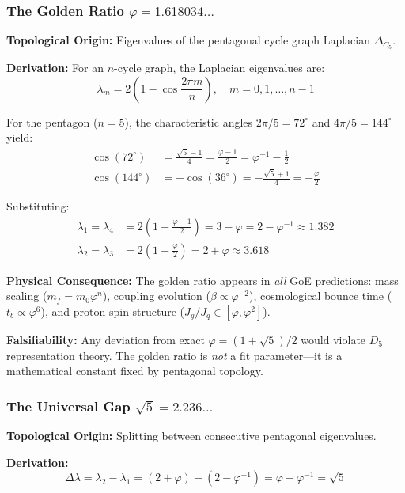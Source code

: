 \documentclass[12pt]{article}
\begin{document}
\subsubsection{The Golden Ratio $\varphi = 1.618034\ldots$}

\textbf{Topological Origin:} Eigenvalues of the pentagonal cycle graph Laplacian $\Delta_{C_5}$.

\textbf{Derivation:} For an $n$-cycle graph, the Laplacian eigenvalues are:
\begin{equation}
\lambda_m = 2\left(1 - \cos\frac{2\pi m}{n}\right), \quad m = 0, 1, \ldots, n-1
\end{equation}

For the pentagon ($n=5$), the characteristic angles $2\pi/5 = 72^\circ$ and $4\pi/5 = 144^\circ$ yield:
\begin{align}
\cos(72^\circ) &= \frac{\sqrt{5} - 1}{4} = \frac{\varphi - 1}{2} = \varphi^{-1} - \frac{1}{2} \\
\cos(144^\circ) &= -\cos(36^\circ) = -\frac{\sqrt{5} + 1}{4} = -\frac{\varphi}{2}
\end{align}

Substituting:
\begin{align}
\lambda_1 = \lambda_4 &= 2\left(1 - \frac{\varphi - 1}{2}\right) = 3 - \varphi = 2 - \varphi^{-1} \approx 1.382 \\
\lambda_2 = \lambda_3 &= 2\left(1 + \frac{\varphi}{2}\right) = 2 + \varphi \approx 3.618
\end{align}

\textbf{Physical Consequence:} The golden ratio appears in \textit{all} GoE predictions: mass scaling ($m_f = m_0 \varphi^n$), coupling evolution ($\beta \propto \varphi^{-2}$), cosmological bounce time ($t_b \propto \varphi^6$), and proton spin structure ($J_g/J_q \in [\varphi, \varphi^2]$).

\textbf{Falsifiability:} Any deviation from exact $\varphi = (1+\sqrt{5})/2$ would violate $D_5$ representation theory. The golden ratio is \textit{not} a fit parameter—it is a mathematical constant fixed by pentagonal topology.

\subsubsection{The Universal Gap $\sqrt{5} = 2.236\ldots$}

\textbf{Topological Origin:} Splitting between consecutive pentagonal eigenvalues.

\textbf{Derivation:}
\begin{equation}
\Delta\lambda = \lambda_2 - \lambda_1 = (2 + \varphi) - (2 - \varphi^{-1}) = \varphi + \varphi^{-1} = \sqrt{5}
\end{equation}
\end{document}
